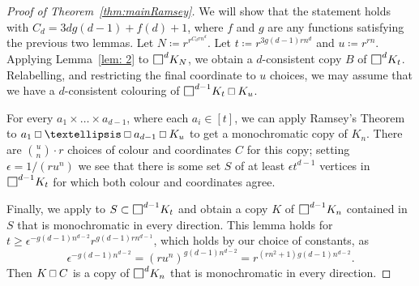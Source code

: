 \documentclass[10pt]{article}
\DeclareMathOperator*{\ourbox}{\text{\raisebox{-0.25ex}{\scalebox{1.25}{$\square$}}}}
\newcommand\Osq{\mathbin{\text{\scalebox{.84}{$\square$}}}}
\begin{document}
\begin{proof}[Proof of Theorem~\ref{thm:mainRamsey}]
We will show that the statement holds with $C_d=3dg(d-1)+f(d)+1$, where $f$ and $g$ are
any functions satisfying the previous two lemmas.
Let $N\coloneqq r^{r^{C_drn^{d}}}$. Let $t\coloneqq r^{3g(d-1)rn^{d}}$ and $u\coloneqq r^{rn}$. 
Applying Lemma~\ref{lem: 2} to $\ourbox^{d}\!K_{N}$, we obtain a $d$-consistent copy $B$ of $\ourbox^{d}\!K_t$. Relabelling, and restricting the final coordinate to $u$ choices, we may assume that we have a $d$-consistent colouring of $\ourbox^{d-1}\!K_t\Osq K_u$. 

For every $a_1\times \dots \times a_{d-1}$, where each $a_i\in [t]$, we can apply Ramsey's Theorem to $a_1\Osq \dots \Osq a_{d-1}\Osq K_{u}$ to get a monochromatic copy of $K_n$. 
There are $\binom{u}{n}\cdot r$ choices of colour and coordinates $C$ for this copy; setting
$\epsilon=1/(ru^{n})$ we see that there is some set $S$ of at least $\epsilon t^{d-1}$ vertices in $\ourbox^{d-1}\!K_t$ for which both colour and coordinates agree.

%
%
%

Finally, we apply  to 
$S\subset\ourbox^{d-1}\!K_t$
and obtain a copy $K$ of $\ourbox^{d-1}\!K_n$ contained in $S$ that is monochromatic in every direction. This lemma holds for
$t\ge \epsilon^{-g(d-1)n^{d-2}}r^{g(d-1)rn^{d-1}}$, which holds by our choice of constants,
as 
$$\epsilon^{-g(d-1)n^{d-2}}
=(ru^n)^{g(d-1)n^{d-2}}
=r^{(rn^2+1)g(d-1)n^{d-2}}.$$
Then $K\Osq C$ is a copy of $\ourbox^{d}\!K_n$ that is monochromatic in every direction.
%
\end{proof}
\end{document}
